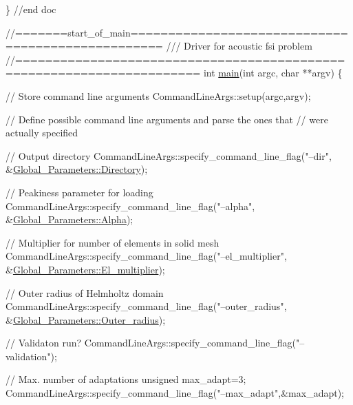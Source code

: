 \begin{DoxyCodeInclude}
{{{{{{{{{\} \textcolor{comment}{//end doc}



\textcolor{comment}{//=======start\_of\_main==================================================}\textcolor{comment}{}
\textcolor{comment}{/// Driver for acoustic fsi problem}
\textcolor{comment}{}\textcolor{comment}{//======================================================================}
\textcolor{keywordtype}{int} \hyperlink{acoustic__fsi_8cc_a3c04138a5bfe5d72780bb7e82a18e627}{main}(\textcolor{keywordtype}{int} argc, \textcolor{keywordtype}{char} **argv)
\{

 \textcolor{comment}{// Store command line arguments}
 CommandLineArgs::setup(argc,argv);

 \textcolor{comment}{// Define possible command line arguments and parse the ones that}
 \textcolor{comment}{// were actually specified}
 
 \textcolor{comment}{// Output directory}
 CommandLineArgs::specify\_command\_line\_flag(\textcolor{stringliteral}{"--dir"},
                                            &\hyperlink{namespaceGlobal__Parameters_a301ab922df72030c660b21328d6caf76}{Global\_Parameters::Directory});
 
 \textcolor{comment}{// Peakiness parameter for loading}
 CommandLineArgs::specify\_command\_line\_flag(\textcolor{stringliteral}{"--alpha"},
                                            &\hyperlink{namespaceGlobal__Parameters_afbe27ad463a1fb23cb99d029a9fac731}{Global\_Parameters::Alpha});

 \textcolor{comment}{// Multiplier for number of elements in solid mesh}
 CommandLineArgs::specify\_command\_line\_flag(\textcolor{stringliteral}{"--el\_multiplier"},
                            &\hyperlink{namespaceGlobal__Parameters_a35d5d2ecfff0cec6150a5dc79e5c1ad1}{Global\_Parameters::El\_multiplier});
 
 \textcolor{comment}{// Outer radius of Helmholtz domain}
 CommandLineArgs::specify\_command\_line\_flag(\textcolor{stringliteral}{"--outer\_radius"},
                            &\hyperlink{namespaceGlobal__Parameters_a88ded445ecd7bd89701409e68fd0b900}{Global\_Parameters::Outer\_radius});
  
 \textcolor{comment}{// Validaton run?}
 CommandLineArgs::specify\_command\_line\_flag(\textcolor{stringliteral}{"--validation"});
 
 \textcolor{comment}{// Max. number of adaptations}
 \textcolor{keywordtype}{unsigned} max\_adapt=3;
 CommandLineArgs::specify\_command\_line\_flag(\textcolor{stringliteral}{"--max\_adapt"},&max\_adapt);
 
}}}}}}}}}
\end{DoxyCodeInclude}
